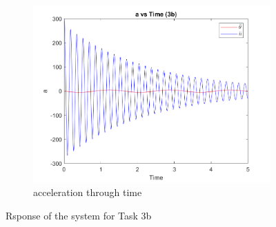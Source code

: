 \documentclass[a4paper,12pt]{article}
\begin{document}
\begin{figure}[h]
  \vspace{0.5cm}

  \begin{subfigure}[b]{0.5\textwidth}
      \includegraphics[width=\textwidth]{../../Matlab/task3b_plots/a_vs_time.png}
      \caption{acceleration through time}
      \label{fig:image9}
  \end{subfigure}
  \hfill
  
  \caption{Rsponse of the system for Task 3b}
  \label{fig:response_task3b}
\end{figure}

\end{document}
